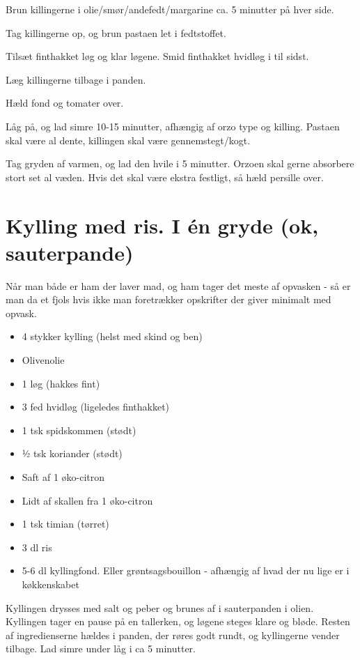 \documentclass[
]{book}
\providecommand{\tightlist}{%
  \setlength{\itemsep}{0pt}\setlength{\parskip}{0pt}}
\begin{document}
Brun killingerne i olie/smør/andefedt/margarine
ca. 5 minutter på hver side.

Tag killingerne op, og brun pastaen let i fedtstoffet.

Tilsæt finthakket løg og klar løgene. Smid finthakket hvidløg i til sidst.

Læg killingerne tilbage i panden.

Hæld fond og tomater over.

Låg på, og lad simre 10-15 minutter, afhængig af orzo type og killing.
Pastaen skal være al dente, killingen skal være gennemstegt/kogt.

Tag gryden af varmen, og lad den hvile i 5 minutter. Orzoen skal gerne absorbere
stort set al væden. Hvis det skal være ekstra festligt, så hæld persille over.

\hypertarget{kylling-med-ris.-i-uxe9n-gryde-ok-sauterpande}{%
\section{Kylling med ris. I én gryde (ok, sauterpande)}\label{kylling-med-ris.-i-uxe9n-gryde-ok-sauterpande}}

Når man både er ham der laver mad, og ham tager det meste af opvasken - så er man da et fjols hvis ikke man foretrækker opskrifter der giver minimalt med opvask.

\begin{itemize}
\tightlist
\item
  4 stykker kylling (helst med skind og ben)
\item
  Olivenolie
\item
  1 løg (hakkes fint)
\item
  3 fed hvidløg (ligeledes finthakket)
\item
  1 tsk spidskommen (stødt)
\item
  ½ tsk koriander (stødt)
\item
  Saft af 1 øko-citron
\item
  Lidt af skallen fra 1 øko-citron
\item
  1 tsk timian (tørret)
\item
  3 dl ris
\item
  5-6 dl kyllingfond. Eller grøntsagsbouillon - afhængig af hvad der nu lige er i køkkenskabet
\end{itemize}

Kyllingen drysses med salt og peber og brunes af i sauterpanden i olien. Kyllingen tager en pause på en tallerken, og løgene steges klare og bløde. Resten af ingredienserne hældes i panden, der røres godt rundt, og kyllingerne vender tilbage. Lad simre under låg i ca 5 minutter.
\end{document}
